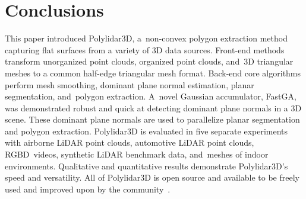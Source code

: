 

\section{Conclusions}\label{sec:ch3_conclusion}

This paper introduced Polylidar3D, a~non-convex polygon extraction method  capturing flat surfaces from a variety of 3D data sources. Front-end methods transform unorganized point clouds, organized point clouds, and~3D triangular meshes to a common half-edge triangular mesh format. Back-end core algorithms perform mesh smoothing, dominant plane normal estimation, planar segmentation, and~polygon extraction. A~novel Gaussian accumulator, FastGA, was demonstrated robust and quick at detecting dominant plane normals in a 3D scene. These dominant plane normals are used to parallelize planar segmentation and polygon extraction. Polylidar3D is evaluated in five separate experiments with airborne LiDAR point clouds, automotive LiDAR point clouds, RGBD~videos, synthetic LiDAR benchmark data, and~meshes of indoor environments. Qualitative and quantitative results demonstrate Polylidar3D's speed and versatility. All of Polylidar3D is open source and available to be freely used and improved upon by the community~\cite{Castagno_Github_Polylidar, Castagno_Github_fastga, Castagno_Github_opf}. 

